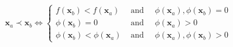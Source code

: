 
\begin{equation}
\mathbf{x}_{a} \prec \mathbf{x}_{b}
\Leftrightarrow\left\{
\begin{array}{ll}
{f\left(\mathbf{x}_{b}\right)<f\left(\mathbf{x}_{a}\right)} & {\text { and } \quad \phi\left(\mathbf{x}_{a}\right), \phi\left(\mathbf{x}_{b}\right)=0} \\

{\phi\left(\mathbf{x}_{b}\right)=0} & {\text { and } \quad \phi\left(\mathbf{x}_{a}\right)>0} \\

{\phi\left(\mathbf{x}_{b}\right)<\phi\left(\mathbf{x}_{a}\right)} & {\text { and } \quad \phi\left(\mathbf{x}_{a}\right), \phi\left(\mathbf{x}_{b}\right)>0}
\end{array}\right.
\label{feasibility_rules}
\end{equation}
